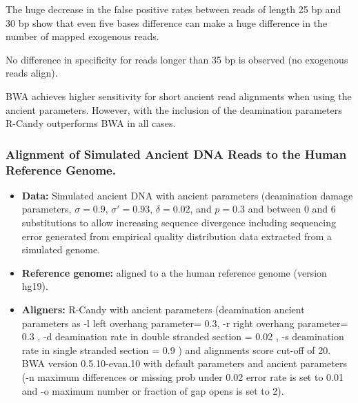 \documentclass[11pt,a4paper]{report}
\begin{document}
The huge decrease in the false positive rates between reads of length 25 bp and
30 bp show that even five bases difference can make a huge difference in the 
number of mapped exogenous reads.


No difference in specificity for reads longer than 35 bp is observed (no exogenous 
reads align).

BWA achieves higher sensitivity for short ancient read alignments when using the 
ancient parameters. However, with the inclusion of the deamination parameters 
R-Candy outperforms BWA in all cases.





\subsubsection{Alignment of Simulated Ancient DNA Reads to the Human Reference Genome.}
\label{Alignment of Simulated Ancient DNA Reads to the Human Reference Genome.}
 
 \begin{itemize}
 
    \item \textbf{Data:} Simulated ancient DNA 
     with ancient parameters (deamination damage parameters, $ \sigma = 0.9$, 
    $ \sigma' = 0.93 $, $\delta = 0.02 $,  and $p = 0.3 $ and 
    between 0 and 6 substitutions to allow increasing sequence divergence
    including sequencing error generated from empirical quality distribution data
    extracted from a simulated genome.
  
   \item \textbf{Reference genome:} aligned to a the human reference genome (version hg19).

 
    \item \textbf{Aligners:} 
	R-Candy with ancient parameters 
	(deamination ancient parameters as -l left overhang parameter= 0.3, -r 
	right overhang parameter= 0.3 , 
	-d deamination rate in double stranded section = 0.02 , 
	-s deamination rate in single stranded section = 0.9 )
	and alignments score cut-off of 20. \\
	BWA version 0.5.10-evan.10 with default parameters and ancient parameters 
	(-n maximum differences or missing prob under 0.02 error rate is set to 0.01 
    and -o maximum number or fraction of gap opens is set to 2)\cite{green2010draft}.
 
  \end{itemize}
 
\end{document}
